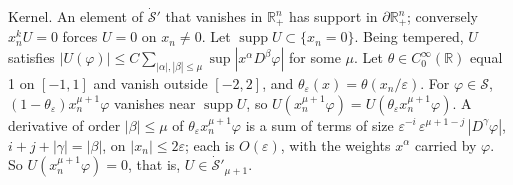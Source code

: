 \documentclass[
  11pt,
]{article}
\begin{document}
Kernel. An element of \(\dot{\mathcal S}'\) that vanishes in
\(\mathbb R^n_+\) has support in \(\partial\mathbb R^n_+\); conversely
\(x_n^kU=0\) forces \(U=0\) on \(x_n\neq0\). Let
\(\operatorname{supp}U\subset\{x_n=0\}\). Being tempered, \(U\)
satisfies
\(|U(\varphi)|\leq C\sum_{|\alpha|,|\beta|\leq\mu}\sup|x^\alpha D^\beta\varphi|\)
for some \(\mu\). Let \(\theta\in C_0^\infty(\mathbb R)\) equal 1 on
\([-1,1]\) and vanish outside \([-2,2]\), and
\(\theta_\varepsilon(x)=\theta(x_n/\varepsilon)\). For
\(\varphi\in\mathcal S\), \((1-\theta_\varepsilon)x_n^{\mu+1}\varphi\)
vanishes near \(\operatorname{supp}U\), so
\(U(x_n^{\mu+1}\varphi)=U(\theta_\varepsilon x_n^{\mu+1}\varphi)\). A
derivative of order \(|\beta|\leq\mu\) of
\(\theta_\varepsilon x_n^{\mu+1}\varphi\) is a sum of terms of size
\(\varepsilon^{-i}\,\varepsilon^{\mu+1-j}\,|D^\gamma\varphi|\),
\(i+j+|\gamma|=|\beta|\), on \(|x_n|\leq2\varepsilon\); each is
\(O(\varepsilon)\), with the weights \(x^\alpha\) carried by
\(\varphi\). So \(U(x_n^{\mu+1}\varphi)=0\), that is,
\(U\in\dot{\mathcal S}'_{\mu+1}\).
\end{document}
